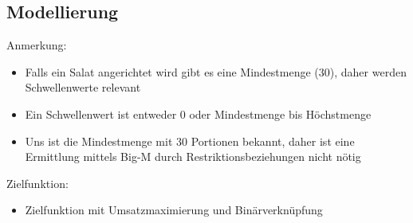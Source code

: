 \documentclass[a4paper,11pt]{article}
\begin{document}
\subsection*{Modellierung}

Anmerkung: \\
\begin{itemize}
    \item Falls ein Salat angerichtet wird gibt es eine Mindestmenge (30), daher werden Schwellenwerte relevant \\
    \item Ein Schwellenwert ist entweder 0 oder Mindestmenge bis Höchstmenge \\
    \item Uns ist die Mindestmenge mit 30 Portionen bekannt, daher ist eine Ermittlung mittels Big-M durch Restriktionsbeziehungen nicht nötig
\end{itemize}
    \bigbreak
    Zielfunktion: \\
\begin{itemize}
    \item Zielfunktion mit Umsatzmaximierung und Binärverknüpfung
\end{itemize}
\end{document}
